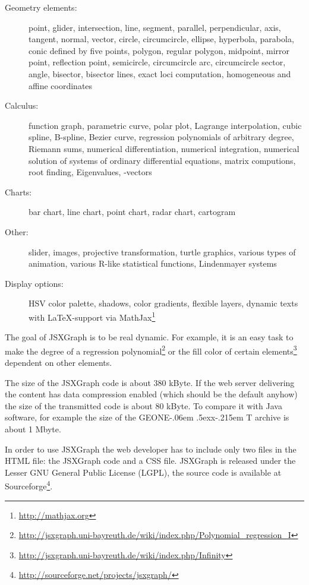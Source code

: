 \documentclass[12pt,a4paper]{article}%
\def\GEONExT{GEONE\kern-.06em \lower.5ex\hbox{x}\kern-.215em T}
\begin{document}
\begin{description}
\item[Geometry elements:]
point, glider, intersection, line, segment, parallel, perpendicular,
axis, tangent, normal, vector, 
circle, circumcircle, ellipse, hyperbola, parabola, conic defined by five points,
polygon, regular polygon, 
midpoint, mirror point, reflection point, 
semicircle, circumcircle arc, circumcircle sector,
angle, bisector, bisector lines,
exact loci computation, homogeneous and affine coordinates
\item[Calculus:]
function graph, parametric curve, polar plot, 
Lagrange interpolation, cubic spline, B-spline, Bezier curve,
regression polynomials of arbitrary degree, 
Riemann sums, 
numerical differentiation, numerical integration,
numerical solution of systems of ordinary differential equations,
matrix computions, root finding,
Eigenvalues, -vectors
\item[Charts:]
bar chart, line chart, point chart, radar chart, cartogram
\item[Other:]
slider, images, 
projective transformation, turtle graphics, various types of animation,
various R-like statistical functions, Lindenmayer systems
\item[Display options:]
HSV color palette, shadows, color gradients, flexible layers,
dynamic texts with \LaTeX{}-support 
via MathJax\footnote{\href{http://mathjax.org}{http://mathjax.org}}

\end{description}
The goal of JSXGraph is to be real dynamic. For example, 
it is an easy task to make the degree of a regression 
polynomial\footnote{\href{http://jsxgraph.uni-bayreuth.de/wiki/index.php/Polynomial_regression_I}{http://jsxgraph.uni-bayreuth.de/wiki/index.php/Polynomial\_regression\_I}} 
or the fill color of certain 
elements\footnote{\href{http://jsxgraph.uni-bayreuth.de/wiki/index.php/Infinity}{http://jsxgraph.uni-bayreuth.de/wiki/index.php/Infinity}} 
dependent on other elements.

The  size 
of the JSXGraph code is about 380 kByte. If the web server delivering the 
content has data compression enabled (which should be the default anyhow) the 
size of the transmitted code is about 80 kByte. To compare it with Java software, 
for example the size of the \GEONExT{} archive is about 1 Mbyte. 

In order to use JSXGraph 
the web developer has to include only two files in the 
HTML file: the JSXGraph code and a CSS file. 
JSXGraph 
is released under the Lesser GNU General Public License (LGPL), the source code
is available at Sourceforge\footnote{\href{http://sourceforge.net/projects/jsxgraph/}{http://sourceforge.net/projects/jsxgraph/}}.
\end{document}
